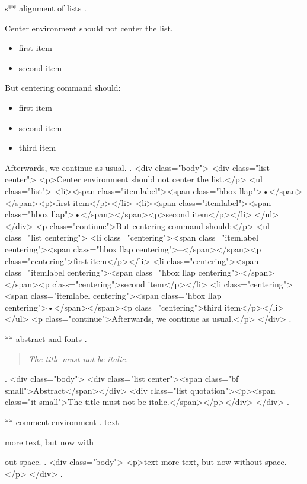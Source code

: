 s** alignment of lists
.
\begin{center}
    Center environment should not center the list.
    \begin{itemize}
        \item first item
        \item second item
    \end{itemize}
\end{center}
But centering command should:
\begin{itemize}
    \centering
    \item[\textendash] first item
    \item[] second item
    \item third item
\end{itemize}
Afterwards, we continue as usual.
.
<div class="body">
<div class="list center">
<p>Center environment should not center the list.</p>
<ul class="list">
<li><span class="itemlabel"><span class="hbox llap">•</span></span><p>ﬁrst item</p></li>
<li><span class="itemlabel"><span class="hbox llap">•</span></span><p>second item</p></li>
</ul>
</div>
<p class="continue">But centering command should:</p>
<ul class="list centering">
<li class="centering"><span class="itemlabel centering"><span class="hbox llap centering">–</span></span><p class="centering">ﬁrst item</p></li>
<li class="centering"><span class="itemlabel centering"><span class="hbox llap centering"></span></span><p class="centering">second item</p></li>
<li class="centering"><span class="itemlabel centering"><span class="hbox llap centering">•</span></span><p class="centering">third item</p></li>
</ul>
<p class="continue">Afterwards, we continue as usual.</p>
</div>
.


** abstract and fonts
.
\begin{abstract}
\itshape
The title must not be italic.
\end{abstract}
.
<div class="body">
<div class="list center"><span class="bf small">Abstract</span></div>
<div class="list quotation"><p><span class="it small">The title must not be italic.</span></p></div>
</div>
.


** comment environment
.
text
\begin{comment}
    This is a comment.
    \end{comment
    still more comment.
\end{comment}
more text, but now with%
\begin{comment}
    This is a comment.
\end{comment}
out space.
.
<div class="body">
<p>text more text, but now without space.</p>
</div>
.
